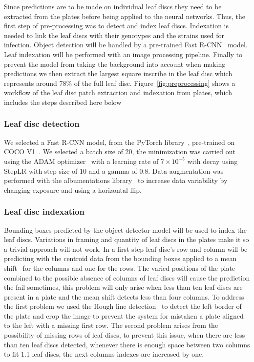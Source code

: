 \documentclass[english]{article}
\begin{document}
Since predictions are to be made on individual leaf discs they need to be extracted from the plates before being applied to the neural networks. Thus, the first step of pre-processing was to detect and index leaf discs. Indexation is needed to link the leaf discs with their genotypes and the strains used for infection.
Object detection will be handled by a pre-trained Fast R-CNN~\parencite{girshickFastRCNN2015} model. Leaf indexation will be performed with an image processing pipeline. Finally to prevent the model from taking the background into account when making predictions we then extract the largest square inscribe in the leaf disc which represents around 78\% of the full leaf disc. Figure~\ref{fig:preprocessing} shows a workflow of the leaf disc patch extraction and indexation from plates, which includes the steps described here below

\subsubsection{Leaf disc detection}
We selected a Fast R-CNN model, from the PyTorch library~\parencite{falcon2019pytorch}, pre-trained on COCO V1~\parencite{linMicrosoftCOCOCommon2015}. We selected a batch size of 20, the minimization was carried out using the ADAM optimizer~\parencite{kingmaAdamMethodStochastic2017} with a learning rate of $7\times 10^{-5}$ with decay using StepLR with step size of 10 and a gamma of 0.8. Data augmentation was performed with the albumentations library~\parencite{buslaevAlbumentationsFastFlexible2020} to increase data variability by changing exposure and using a horizontal flip.

\subsubsection{Leaf disc indexation}
Bounding boxes predicted by the object detector model will be used to index the leaf discs. Variations in framing and quantity of leaf discs in the plates make it so a trivial approach will not work.
In a first step leaf disc's row and column will be predicting with the centroid data from the bounding boxes applied to a mean shift~\parencite{comaniciuMeanShiftRobust2002a} for the columns and one for the rows. The varied positions of the plate combined to the possible absence of columns of leaf discs will cause the prediction the fail sometimes, this problem will only arise when less than ten leaf discs are present in a plate and the mean shift detects less than four columns. To address the first problem we used the Hough line detection~\parencite{dudaUseHoughTransformation1972} to detect the left border of the plate and crop the image to prevent the system for mistaken a plate aligned to the left with a missing first row. The second problem arises from the possibility of missing rows of leaf discs, to prevent this issue, when there are less than ten leaf discs detected, whenever there is enough space between two columns to fit 1.1 leaf discs, the next columns indexes are increased by one.
\end{document}
